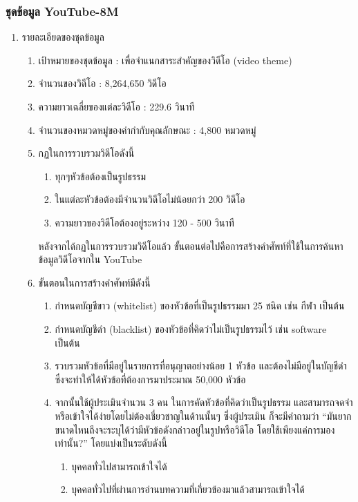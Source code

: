 \subsubsection*{ชุดข้อมูล YouTube-8M} 
\begin{enumerate}
	\item {รายละเอียดของชุดข้อมูล}
	\begin{enumerate}
		\setlength\itemsep{-0.25em}
		\item เป้าหมายของชุดข้อมูล : เพื่อจำแนกสาระสำคัญของวิดีโอ (video theme)
		\item จำนวนของวิดีโอ : 8,264,650 วิดีโอ
		\item ความยาวเฉลี่ยของแต่ละวิดีโอ : 229.6 วินาที
		\item จำนวนของหมวดหมู่ของคำกำกับคุณลักษณะ : 4,800 หมวดหมู่
		\item กฏในการรวบรวมวิดีโอดังนี้
		\begin{enumerate}
			\setlength\itemsep{-0.25em}
			\item ทุกๆหัวข้อต้องเป็นรูปธรรม
			\item ในแต่ละหัวข้อต้องมีจำนวนวิดีโอไม่น้อยกว่า 200 วิดีโอ
			\item ความยาวของวิดีโอต้องอยู่ระหว่าง 120 - 500 วินาที
		\end{enumerate}
		หลังจากได้กฏในการรวบรวมวิดีโอแล้ว ขั้นตอนต่อไปคือการสร้างคำศัพท์ที่ใช้ในการค้นหาข้อมูลวิดีโอจากใน YouTube 
		\item ขั้นตอนในการสร้างคำศัพท์มีดังนี้
		\begin{enumerate}
			\setlength\itemsep{-0.25em}
			\item กำหนดบัญชีขาว (whitelist) ของหัวข้อที่เป็นรูปธรรมมา 25 ชนิด เช่น กีฬา เป็นต้น
			\item กำหนดบัญชีดำ (blacklist) ของหัวข้อที่คิดว่าไม่เป็นรูปธรรมไว้ เช่น software เป็นต้น
			\item รวบรวมหัวข้อที่มีอยู่ในรายการที่อนุญาตอย่างน้อย 1 หัวข้อ และต้องไม่มีอยู่ในบัญชีดำซึ่งจะทำให้ได้หัวข้อที่ต้องการมาประมาณ 50,000 หัวข้อ
			\item จากนั้นใช้ผู้ประเมินจำนวน 3 คน ในการคัดหัวข้อที่คิดว่าเป็นรูปธรรม และสามารถจดจำหรือเข้าใจได้ง่ายโดยไม่ต้องเชี่ยวชาญในด้านนั้นๆ 
			ซึ่งผู้ประเมิน ก็จะมีคำถามว่า “มันยากขนาดไหนถึงจะระบุได้ว่ามีหัวข้อดังกล่าวอยู่ในรูปหรือวิดีโอ โดยใช้เพียงแค่การมองเท่านั้น?” โดยแบ่งเป็นระดับดังนี้
			\begin{enumerate}
				\setlength\itemsep{-0.25em}
				\item บุคคลทั่วไปสามารถเข้าใจได้
				\item บุคคลทั่วไปที่ผ่านการอ่านบทความที่เกี่ยวข้องมาแล้วสามารถเข้าใจได้

\end{enumerate}
\end{enumerate}
\end{enumerate}
\end{enumerate}
